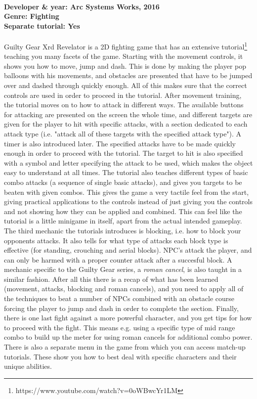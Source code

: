 \paragraph{Developer \& year: Arc Systems Works, 2016 \\ Genre: Fighting \\ Separate tutorial: Yes \\}
Guilty Gear Xrd Revelator is a 2D fighting game that has an extensive tutorial\footnote{https://www.youtube.com/watch?v=0oWBwcYr1LM}
teaching you many facets of the game. Starting with the movement controls, it
shows you how to move, jump and dash. This is done by making the player pop
balloons with his movements, and obstacles are presented that have to be
jumped over and dashed through quickly enough. All of this makes sure that the correct controls are used in
order to proceed in the tutorial.
After movement training, the tutorial moves on to how to attack in different
ways. The available buttons for attacking are presented on the screen the
whole time, and different targets are given for the player to hit with
specific attacks, with a section dedicated to each attack type (i.e. "attack
all of these targets with the specified attack type"). A timer is also
introduced later. The specified attacks have to be made quickly enough in
order to proceed with the tutorial. The target to hit is also specified with a
symbol and letter specifying the attack to be used, which makes the object
easy to understand at all times. The tutorial also teaches different types of
basic combo attacks (a sequence of single basic attacks), and gives you targets to be beaten with given combos.
This gives the game a very tactile feel from the start, giving practical
applications to the controls instead of just giving you the controls and not
showing how they can be applied and combined. This can feel like the tutorial is a little
minigame in itself, apart from the actual intended gameplay.
The third mechanic the tutorials introduces is blocking, i.e. how to block
your opponents attacks. It also tells for what type of attacks each block
type is effective (for standing, crouching and aerial blocks). NPC's attack
the player, and can only be harmed with a proper counter attack after a
succesful block. A mechanic specific to the Guilty Gear series, a \textit{roman cancel}, is also taught in a similar fashion.
After all this there is a recap of what has been learned (movement, attacks,
blocking and roman cancels), and you need to apply all of the techniques to
beat a number of NPCs combined with an obstacle course forcing the player to
jump and dash in order to complete the section. Finally, there is one last
fight against a more powerful character, and you get tips for how to proceed
with the fight. This means e.g. using a specific type of mid range combo to
build up the meter for using roman cancels for additional combo power.
There is also a separate menu in the game from which you can access match-up
tutorials. These show you how to best deal with specific characters and their
unique abilities.

